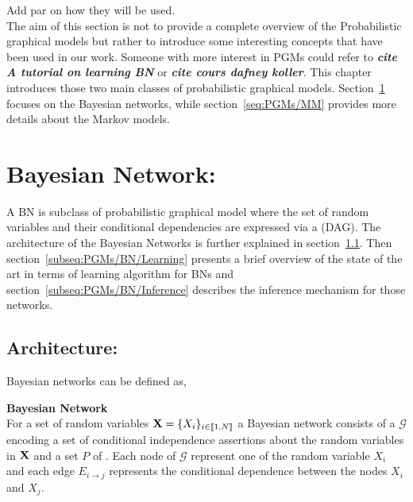 \documentclass[a4paper,11pt]{report}
\begin{document}
{  Add par on how they will be used.\\ %
  
  The aim of this section is not to provide a complete overview of the Probabilistic graphical models but rather to introduce some interesting concepts that have been used in our work. Someone with more interest in PGMs could refer to \textbf{\textit{cite A tutorial on learning BN}} or \textbf{\textit{cite cours dafney koller}}. 
  This chapter introduces those two main classes of probabilistic graphical models. Section~\ref{seq:PGMs/BN} focuses on the Bayesian networks, while section~\ref{seq:PGMs/MM} provides more details about the Markov models.
	
  \section{Bayesian Network:}  
    \label{seq:PGMs/BN}
    A BN is subclass of probabilistic graphical model where the set of random variables and their conditional dependencies are expressed via a  (DAG). The architecture of the Bayesian Networks is further explained in section~\ref{subseq:PGMs/BN/Architecture}. Then section~\ref{subseq:PGMs/BN/Learning} presents a brief overview of the state of the art in terms of learning algorithm for BNs and section~\ref{subseq:PGMs/BN/Inference} describes the inference mechanism for those networks.
        
    \subsection{Architecture:}
      \label{subseq:PGMs/BN/Architecture}
      
      Bayesian networks can be defined as,
      
      \begin{defn} \textbf{Bayesian Network}\\
				For a set of random variables ${\bf X} = \{X_{i}\}_{i \in \llbracket1,N \rrbracket}$ a Bayesian network consists of a  $\mathcal{G}$ encoding a set of conditional independence assertions about the random variables in ${\bf X}$ and  a set $P$ of . Each node of $\mathcal{G}$ represent one of the random variable $X_{i}$ and each edge $E_{i \rightarrow j}$ represents the conditional dependence between the nodes $X_{i}$ and $X_{j}$.
				\label{def:BN}
      \end{defn}
     
}
\end{document}
